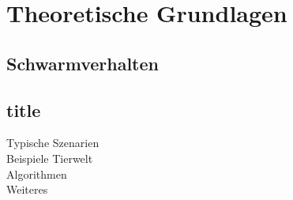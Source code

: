 \section{Theoretische Grundlagen}
\subsection{Schwarmverhalten}
\subsection{title}
Typische Szenarien\\
Beispiele Tierwelt\\
Algorithmen\\
Weiteres